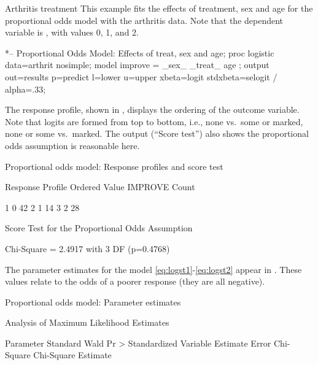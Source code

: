 \begin{Example}[arthrit12]{Arthritis treatment}
This example fits the effects of treatment,
sex and age for the proportional odds model with the arthritis data.
Note that the dependent variable is , with values 0, 1,
and 2.

\begin{listing}
   *-- Proportional Odds Model: Effects of treat, sex and age;
proc logistic data=arthrit nosimple;
   model  improve = _sex_  _treat_ age ;
   output out=results p=predict l=lower u=upper
                      xbeta=logit stdxbeta=selogit / alpha=.33;
\end{listing}

The response profile,
shown in , displays the ordering of the outcome variable.
Note that logits are formed from top to bottom, i.e., none vs.\  some
or marked, none or some vs.\  marked.  The output (``Score test'')
also shows the
proportional odds assumption is reasonable here.
\begin{Output}[htb]
\caption{Proportional odds model: Response profiles and score test}\label{out:glogist2.1}
\begin{output}
                          Response Profile
                     Ordered
                       Value  IMPROVE     Count

                           1        0        42
                           2        1        14
                           3        2        28

          Score Test for the Proportional Odds Assumption

              Chi-Square = 2.4917 with 3 DF (p=0.4768)
\end{output}
\end{Output}

The parameter estimates
for the model \eqref{eq:logst1}-\eqref{eq:logst2} appear in
.
These values relate to the odds of a poorer response (they
are all negative).

\begin{Output}[htb]
\caption{Proportional odds model: Parameter estimates}\label{out:glogist2.2}
\begin{output}
              Analysis of Maximum Likelihood Estimates

             Parameter  Standard     Wald        Pr >    Standardized
   Variable   Estimate    Error   Chi-Square  Chi-Square   Estimate


\end{output}
\end{Output}
\end{Example}
